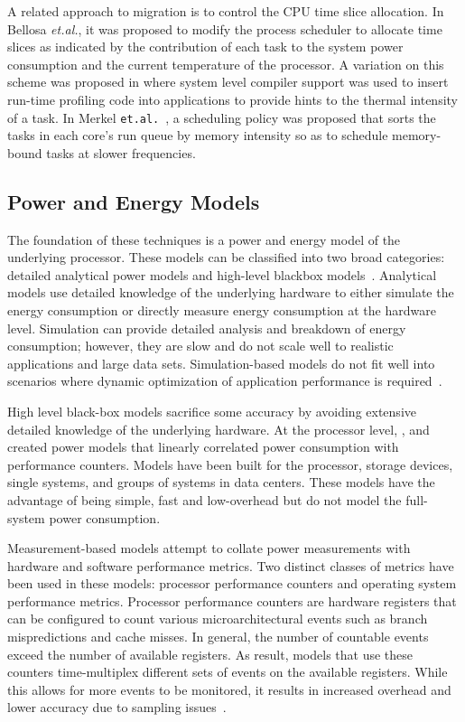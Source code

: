 \documentclass[acmtaco]{acmtrans2m}
\begin{document}
A related approach to migration is to control the CPU time slice
allocation.  In Bellosa \textit{et.al.}\cite{Bellosa2003}, it was
proposed to modify the process scheduler to allocate time slices as
indicated by the contribution of each task to the system power
consumption and the current temperature of the processor. A variation on
this scheme was proposed in \cite{LiK2008} where system level compiler
support was used to insert run-time profiling code into applications to
provide hints to the thermal intensity of a task. In Merkel
\texttt{et.al.}~\cite{Merkel2008b}, a scheduling policy was proposed
that sorts the tasks in each core's run queue by memory intensity so as
to schedule memory-bound tasks at slower frequencies.

\subsection{Power and Energy Models}
\label{sec:models}

The foundation of these techniques is a power and energy model of the
underlying processor.  These models can be classified into two
broad categories: detailed analytical power models and high-level
blackbox models~\cite{Rivoire2008b}. Analytical models use detailed
knowledge of the underlying hardware to either simulate the energy
consumption or directly measure energy consumption at the hardware
level.  Simulation can provide detailed analysis and breakdown of energy
consumption; however, they are slow and do not scale well to realistic
applications and large data sets.  Simulation-based models do not fit
well into scenarios where dynamic optimization of application
performance is required~\cite{Economou2006}. 

High level black-box models sacrifice some accuracy by avoiding
extensive detailed knowledge of the underlying hardware.  At the
processor level, \cite{Contreras2005}, and \cite{Bellosa2003} created
power models that linearly correlated power consumption with performance
counters. Models have been built for the processor, storage devices,
single systems, and groups of systems in data centers.  These models
have the advantage of being simple, fast and low-overhead but do not
model the full-system power consumption.

Measurement-based models attempt to collate power measurements with
hardware and software performance metrics.  Two distinct classes of
metrics have been used in these models: processor performance counters
and operating system performance metrics.  Processor performance
counters are hardware registers that can be configured to count various
microarchitectural events such as branch mispredictions and cache
misses.  In general, the number of countable events exceed the number of
available registers.  As result, models that use these counters
time-multiplex different sets of events on the available registers.
While this allows for more events to be monitored, it results in
increased overhead and lower accuracy due to sampling
issues~\cite{Economou2006}\cite{Rivoire2008a}.
\end{document}

